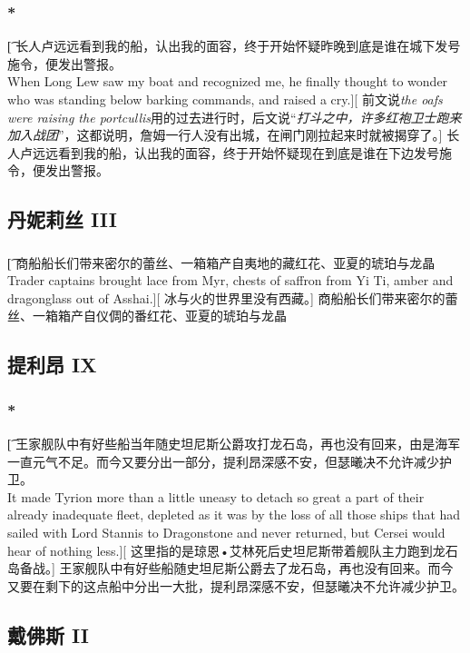 \documentclass[12pt,a4paper]{article}
\begin{document}
\subsubsection{\color{red}*}\t[	
	长人卢远远看到我的船，认出我的面容，终于开始怀疑昨晚到底是谁在城下发号施令，便发出警报。\\
	When Long Lew saw my boat and recognized me, he finally thought to wonder who was standing below barking commands, and raised a cry.][
	前文说\emph{the oafs were raising the portcullis}用的过去进行时，后文说“\emph{打斗之中，许多红袍卫士跑来加入战团}”，这都说明，詹姆一行人没有出城，在闸门刚拉起来时就被揭穿了。]
	长人卢远远看到我的船，认出我的面容，终于开始怀疑现在到底是谁在下边发号施令，便发出警报。
	
\subsection{丹妮莉丝 III}
\subsubsection{}\t[	
	商船船长们带来密尔的蕾丝、一箱箱产自夷地的藏红花、亚夏的琥珀与龙晶\\
	Trader captains brought lace from Myr, chests of saffron from Yi Ti, amber and dragonglass out of Asshai.][
	冰与火的世界里没有西藏。]
	商船船长们带来密尔的蕾丝、一箱箱产自仪倜的番红花、亚夏的琥珀与龙晶
	
\subsection{提利昂 IX}
\subsubsection{\color{red}*}\t[	
	王家舰队中有好些船当年随史坦尼斯公爵攻打龙石岛，再也没有回来，由是海军一直元气不足。而今又要分出一部分，提利昂深感不安，但瑟曦决不允许减少护卫。\\
	It made Tyrion more than a little uneasy to detach so great a part of their already inadequate fleet, depleted as it was by the loss of all those ships that had sailed with Lord Stannis to Dragonstone and never returned, but Cersei would hear of nothing less.][
	这里指的是琼恩•艾林死后史坦尼斯带着舰队主力跑到龙石岛备战。]
	王家舰队中有好些船随史坦尼斯公爵去了龙石岛，再也没有回来。而今又要在剩下的这点船中分出一大批，提利昂深感不安，但瑟曦决不允许减少护卫。
	

\subsection{戴佛斯 II}
\end{document}
